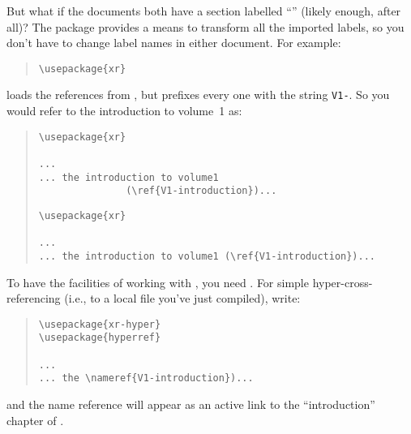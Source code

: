 But what if the documents both have a section labelled
``'' (likely enough, after all)?  The
package provides a means to transform all the imported labels, so you
don't have to change label names in either document.  For example:
\begin{quote}
\begin{verbatim}
\usepackage{xr}

\end{verbatim}
\end{quote}
loads the references from , but prefixes every one with
the string \texttt{V1-}.  So you would refer to the introduction to volume~1
as:
\begin{quote}
\begin{narrowversion}
\begin{verbatim}
\usepackage{xr}

...
... the introduction to volume1
               (\ref{V1-introduction})...
\end{verbatim}
\end{narrowversion}
\begin{wideversion}
\begin{verbatim}
\usepackage{xr}

...
... the introduction to volume1 (\ref{V1-introduction})...
\end{verbatim}
\end{wideversion}
\end{quote}
To have the facilities of  working with
, you need .  For simple
hyper-cross-referencing (i.e., to a local  file you've just
compiled), write:
\begin{quote}
\begin{verbatim}
\usepackage{xr-hyper}
\usepackage{hyperref}

...
... the \nameref{V1-introduction})...
\end{verbatim}
\end{quote}
and the name reference will appear as an active link to the
``introduction'' chapter of .

